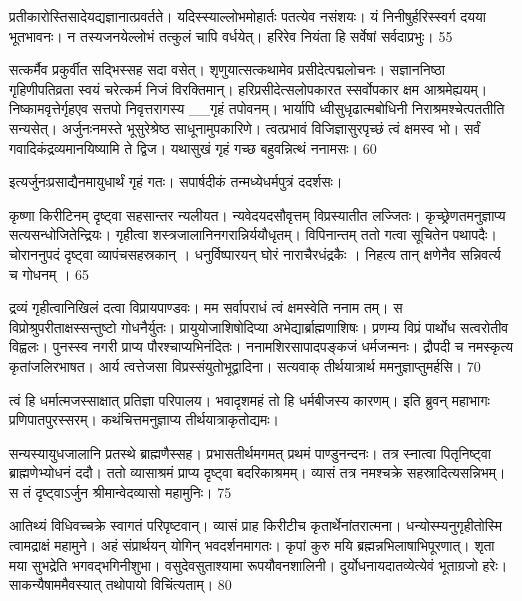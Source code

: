प्रतीकारोस्तिसादेयद्यज्ञानात्प्रवर्तते।
यदिस्स्याल्लोभमोहार्तः पतत्येव नसंशयः।
यं निनीषुर्हरिस्स्वर्ग दयया भूतभावनः।
न तस्यजनयेल्लोभं तत्कुलं चापि वर्धयेत्।
हरिरेव नियंता हि सर्वेषां सर्वदाप्रभुः।
55

सत्कर्मैव प्रकुर्वीत सद्भिस्सह सदा वसेत्।
शृणुयात्सत्कथामेव प्रसीदेत्पद्मलोचनः।
सज्ञाननिष्ठा गृहिणीपतिव्रता स्वयं चरेत्कर्म
निजं विरक्तिमान्।
हरिप्रसीदेत्सलोपकारत स्सर्वोपकार
क्षम आश्रमेह्ययम्।
निष्कामवृत्तेर्गृहएव सत्तपो निवृत्तरागस्य
__गृहं तपोवनम्।
भार्यापि ध्वीसुधृढात्मबोधिनी
निराश्रमश्चेत्पततीति सन्यसेत्।
अर्जुनःनमस्ते भूसुरेश्रेष्ठ साधूनामुपकारिणे।
त्वत्प्रभावं विजिज्ञासुरपृच्छं त्वं क्षमस्व भो।
सर्वं गवादिकंद्रव्यमानयिष्यामि ते द्विज।
यथासुखं गृहं गच्छ बहुवन्नित्थं ननामसः।
60

इत्यर्जुनःप्रसाद्यैनमायुधार्थं गृहं गतः।
सपार्षदीकं तन्मध्येधर्मपुत्रं ददर्शसः।

कृष्णा किरीटिनम् दृष्ट्वा सहसान्तर न्यलीयत।
न्यवेदयदसौवृत्तम् विप्रस्यातीत लज्जितः।
कृच्छ्रेणतमनुज्ञाप्य सत्यसन्धोजितेन्द्रियः।
गृहीत्वा शस्त्रजालानिनगरान्निर्ययौधृतम्।
विपिनान्तम् ततो गत्वा सूचितेन पथापदैः।
चोराननुपदं दृष्ट्वा व्यापंचसहस्रकान् ।
धनुर्विष्पारयन् घोरं नाराचैरधंद्रकैः ।
निहत्य तान् क्षणेनैव सन्निवर्त्य च गोधनम् ।
65

द्रव्यं गृहीत्वानिखिलं दत्वा विप्रायपाण्डवः।
मम सर्वापराधं त्वं क्षमस्वेति ननाम तम्।
स विप्रोश्रुपरीताक्षस्सन्तुष्टो गोधनैर्युतः।
प्रायुयोजाशिषोदिप्या अभेद्यार्ब्राह्मणाशिषः।
प्रणम्य विप्रं पार्थोध सत्वरोतीव विह्वलः।
पुनस्स्व नगरी प्राप्य पौरश्चाप्यभिनंदितः।
ननामशिरसापादपङ्कजं धर्मजन्मनः।
द्रौपदी च नमस्कृत्य कृतांजलिरभाषत।
आर्य त्वत्तेजसा विप्रस्संयुतोभूद्वादिना।
सत्यवाक् तीर्थयात्रार्थ ममनुज्ञाप्तुमर्हसि।
70

त्वं हि धर्मात्मजस्साक्षात् प्रतिज्ञा परिपालय।
भवादृशमहं तो हि धर्मबीजस्य कारणम्।
इति ब्रुवन् महाभागः प्रणिपातपुरस्सरम्।
कथंचित्तमनुज्ञाप्य तीर्थयात्राकृतोद्यमः।

सन्यस्यायुधजालानि प्रतस्थे ब्राह्मणैस्सह।
प्रभासतीर्थमगमत् प्रथमं पाण्डुनन्दनः।
तत्र स्नात्वा पितृनिष्ट्वा ब्राह्मणेभ्योधनं ददौ।
ततो व्यासाश्रमं प्राप्य दृष्ट्वा बदरिकाश्रमम्।
व्यासं तत्र नमश्चक्रे सहस्रादित्यसन्निभम्।
स तं दृष्ट्वाऽर्जुन श्रीमान्वेदव्यासो महामुनिः।
75

आतिथ्यं विधिवच्चक्रे स्वागतं परिपृष्टवान्।
व्यासं प्राह किरीटीच कृतार्थेनांतरात्मना।
धन्योस्म्यनुगृहीतोस्मि त्वामद्राक्षं महामुने।
अहं संप्रार्थयन् योगिन् भवदर्शनमागतः।
कृपां कुरु मयि ब्रह्मन्नभिलाषाभिपूरणात्।
शृता मया सुभद्रेति भगवद्भगिनीशुभा।
वसुदेवसुताश्यामा रूपयौवनशालिनी।
दुर्योधनायदातव्येत्येवं भूताग्रजो हरेः।
साकन्यैषाममैवस्यात् तथोपायो विचिंत्यताम्।
80

